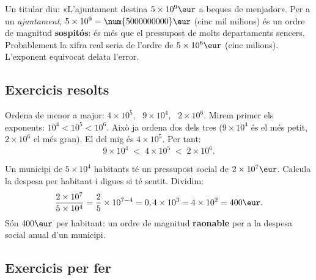 \begin{exemple}
Un titular diu: «L'ajuntament destina $5\times 10^{9}\eur$ a beques de menjador».
Per a un \emph{ajuntament}, $5\times 10^{9}=\num{5000000000}\eur$ (cinc mil milions)
és un ordre de magnitud \textbf{sospitós}: és més que el pressupost de molts
departaments sencers. Probablement la xifra real seria de l'ordre de
$5\times 10^{6}\eur$ (cinc milions). L'exponent equivocat delata l'error.
\end{exemple}

\subsection{Exercicis resolts}

\begin{exresolt}
Ordena de menor a major: $4\times 10^{5}$, \ $9\times 10^{4}$, \ $2\times 10^{6}$.
\solucio
Mirem primer els exponents: $10^{4}<10^{5}<10^{6}$. Això ja ordena dos dels tres
($9\times 10^{4}$ és el més petit, $2\times 10^{6}$ el més gran). El del mig és
$4\times 10^{5}$. Per tant:
\[
9\times 10^{4} \;<\; 4\times 10^{5} \;<\; 2\times 10^{6}.
\]
\end{exresolt}

\begin{exresolt}
Un municipi de $5\times 10^{4}$ habitants té un pressupost social de
$2\times 10^{7}\eur$. Calcula la despesa per habitant i digues si té sentit.
\solucio
Dividim:
\[
\frac{2\times 10^{7}}{5\times 10^{4}}=\frac{2}{5}\times 10^{7-4}=0,4\times 10^{3}
=4\times 10^{2}=400\eur.
\]
Són $400\eur$ per habitant: un ordre de magnitud \textbf{raonable} per a la despesa
social anual d'un municipi.
\end{exresolt}

\subsection{Exercicis per fer}

